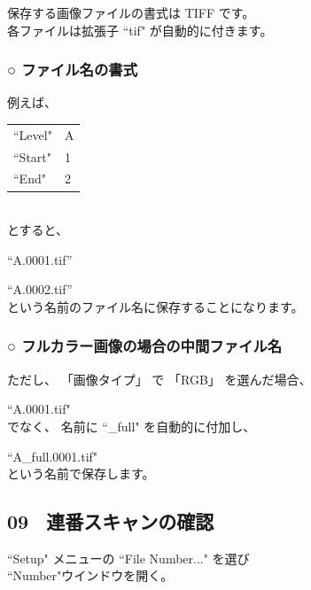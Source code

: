\documentclass[a4paper,10pt]{article}
\begin{document}
\noindent 保存する画像ファイルの書式は TIFF です。\\
各ファイルは拡張子 “tif" が自動的に付きます。\\

\subsubsection*{○ ファイル名の書式}

\noindent 例えば、\\[-1.25em]

\setlength{\tabcolsep}{0em}
\renewcommand{\arraystretch}{1.0}
\begin{tabular}{p{8.5em}l}
“Level" & A\\
“Start" & 1\\
“End" & 2\\
\end{tabular}\\[-0.5em]

\noindent とすると、\par
“A.0001.tif”\par
“A.0002.tif”\\
という名前のファイル名に保存することになります。\\

\subsubsection*{○ フルカラー画像の場合の中間ファイル名}

\noindent ただし、 「画像タイプ」 で 「RGB」 を選んだ場合、\par
“A.0001.tif"\\
でなく、 名前に “\_full" を自動的に付加し、\par
“A\_full.0001.tif"\\
という名前で保存します。

\newpage

\subsection*{09 \ 連番スキャンの確認}

\noindent “Setup" メニューの “File Number..." を選び\\
“Number"ウインドウを開く。
\end{document}
